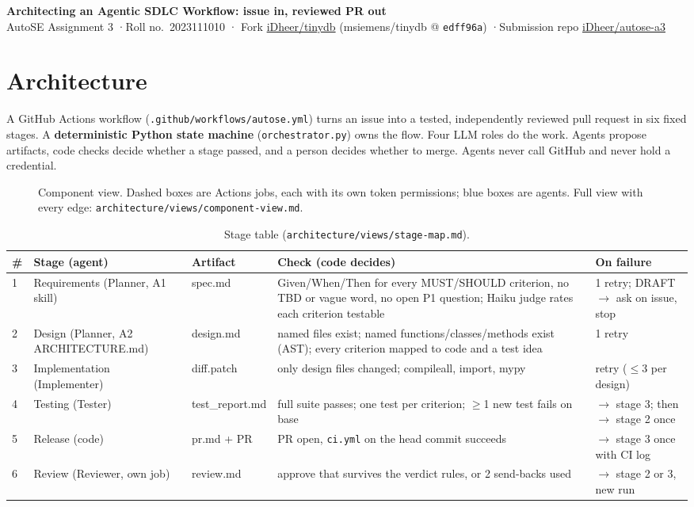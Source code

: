 \documentclass[11pt,a4paper]{article}
\begin{document}
{\Large\bfseries Architecting an Agentic SDLC Workflow: issue in, reviewed PR out}\\[2pt]
AutoSE Assignment 3 \quad·\quad Roll no.\ 2023111010 \quad·\quad
Fork \href{https://github.com/iDheer/tinydb}{iDheer/tinydb} (msiemens/tinydb @ \texttt{edff96a})
\quad·\quad Submission repo \href{https://github.com/iDheer/autose-a3}{iDheer/autose-a3}

\section{Architecture}

A GitHub Actions workflow (\texttt{.github/workflows/autose.yml}) turns an issue into a tested,
independently reviewed pull request in six fixed stages. A \textbf{deterministic Python state
machine} (\texttt{orchestrator.py}) owns the flow. Four LLM roles do the work. Agents propose
artifacts, code checks decide whether a stage passed, and a person decides whether to merge.
Agents never call GitHub and never hold a credential.

\begin{figure}[H]
\centering

\caption{Component view. Dashed boxes are Actions jobs, each with its own token permissions; blue
boxes are agents. Full view with every edge: \texttt{architecture/views/component-view.md}.}
\end{figure}

\vspace{-4pt}
\begin{table}[H]
\centering\scriptsize
\begin{tabularx}{\textwidth}{@{}l p{2.7cm} p{1.6cm} Y p{2.9cm}@{}}
\toprule
\# & Stage (agent) & Artifact & Check (code decides) & On failure \\
 & Requirements (Planner, A1 skill) & spec.md & Given/When/Then for every MUST/SHOULD criterion, no TBD or vague word, no open P1 question; Haiku judge rates each criterion testable & 1 retry; DRAFT $\to$ ask on issue, stop \\
2 & Design (Planner, A2 ARCHITECTURE.md) & design.md & named files exist; named functions/classes/methods exist (AST); every criterion mapped to code and a test idea & 1 retry \\
3 & Implementation (Implementer) & diff.patch & only design files changed; compileall, import, mypy & retry ($\le$3 per design) \\
4 & Testing (Tester) & test\_report.md & full suite passes; one test per criterion; $\ge$1 new test fails on base & $\to$ stage 3; then $\to$ stage 2 once \\
5 & Release (code) & pr.md + PR & PR open, \texttt{ci.yml} on the head commit succeeds & $\to$ stage 3 once with CI log \\
6 & Review (Reviewer, own job) & review.md & approve that survives the verdict rules, or 2 send-backs used & $\to$ stage 2 or 3, new run \\
\bottomrule
\end{tabularx}
\caption{Stage table (\texttt{architecture/views/stage-map.md}).}
\end{table}
\vspace{-6pt}
\end{document}

